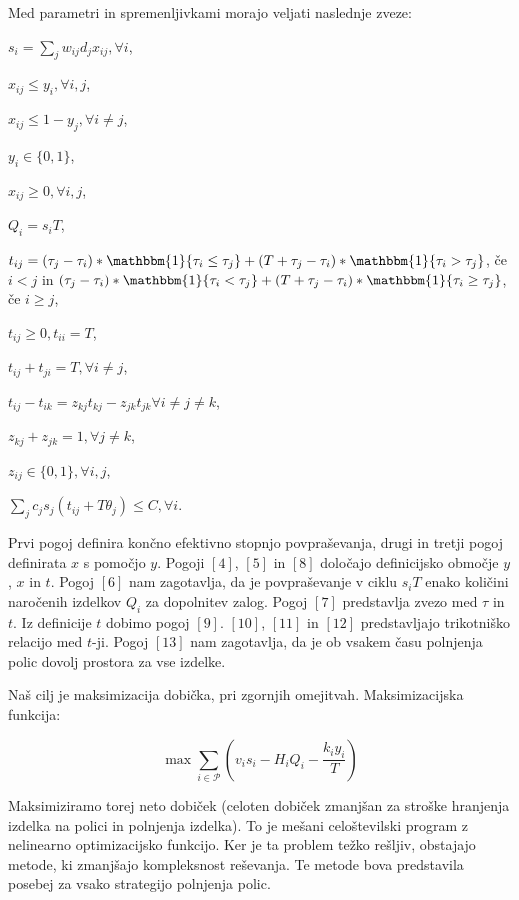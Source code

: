 \documentclass[a4paper]{article}
\begin{document}
Med parametri in spremenljivkami morajo veljati naslednje zveze:
\begin{enumerate}[label={[\arabic*]}]
\item $ s_i = \sum_j w_{ij} d_j x_{ij}, \forall i$,
\item $ x_{ij} \leq y_i, \forall i, j  $,
\item $ x_{ij} \leq 1 - y_j, \forall i \ne j$,
\item $ y_i \in \{0,1\}$,
\item $ x_{ij} \geq 0, \forall i,j$,
\item $Q_i = s_iT$,
\item $t_{ij} = (\tau_j - \tau_i) * \mathbbm{1}\{\tau_i \leq \tau_j\} +  (T + \tau_j - \tau_i) * \mathbbm{1}\{\tau_i > \tau_j\} $, če $i < j$ in $ (\tau_j - \tau_i) * \mathbbm{1}\{\tau_i < \tau_j\} +  (T + \tau_j - \tau_i) * \mathbbm{1}\{\tau_i \geq \tau_j\} $, če $i \geq j $,
\item $t_{ij} \geq 0, t_{ii} = T$,
\item $t_{ij} + t_{ji} = T, \forall i \ne j $,
\item $t_{ij} - t_{ik} = z_{kj} t_{kj} - z_{jk} t_{jk} \forall i \ne j \ne k$,
\item $z_{kj} + z_{jk} = 1, \forall j \ne k$,
\item $z_{ij} \in \{ 0, 1\}, \forall i, j$,
\item $\sum_j c_j s_j (t_{ij} + T \theta_j) \leq C, \forall i$.


\end{enumerate}

Prvi pogoj definira končno efektivno stopnjo povpraševanja, drugi in tretji pogoj definirata $x$ s pomočjo $y$. Pogoji $[4]$, $[5]$ in $[8]$ določajo definicijsko območje $y$, $x$ in $t$. Pogoj $[6]$ nam zagotavlja, da je povpraševanje v ciklu $s_i T$ enako količini naročenih izdelkov $Q_i$ za dopolnitev zalog. Pogoj $[7]$ predstavlja zvezo med $\tau$ in $t$. Iz definicije $t$ dobimo pogoj $[9]$. $[10]$, $[11]$ in $[12]$ predstavljajo trikotniško relacijo med $t$-ji.  Pogoj $[13]$ nam zagotavlja, da je ob vsakem času polnjenja polic dovolj prostora za vse izdelke. 




Naš cilj je maksimizacija dobička, pri zgornjih omejitvah. Maksimizacijska funkcija:

$$  \max  \sum_{i \in \mathcal{P}} ( v_i s_ i - H_i  Q_i - \frac{k_i y_i}{T})   $$ 

\vspace*{1 mm}
Maksimiziramo torej neto dobiček (celoten dobiček zmanjšan za stroške hranjenja izdelka na polici in polnjenja izdelka). To je mešani celoštevilski program z nelinearno optimizacijsko funkcijo. Ker je ta problem težko rešljiv, obstajajo metode, ki zmanjšajo kompleksnost reševanja. Te metode bova predstavila posebej za vsako strategijo polnjenja polic.
\end{document}
